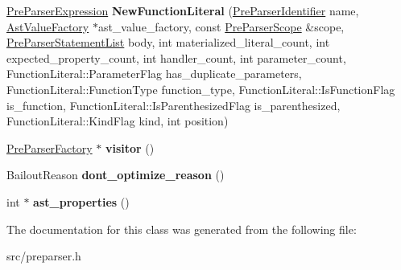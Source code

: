 \begin{DoxyCompactItemize}
\item 
\hypertarget{classv8_1_1internal_1_1_pre_parser_factory_a4cfe54e56810622bf6ef006b8387faaf}{}\hyperlink{classv8_1_1internal_1_1_pre_parser_expression}{Pre\+Parser\+Expression} {\bfseries New\+Function\+Literal} (\hyperlink{classv8_1_1internal_1_1_pre_parser_identifier}{Pre\+Parser\+Identifier} name, \hyperlink{classv8_1_1internal_1_1_ast_value_factory}{Ast\+Value\+Factory} $\ast$ast\+\_\+value\+\_\+factory, const \hyperlink{classv8_1_1internal_1_1_pre_parser_scope}{Pre\+Parser\+Scope} \&scope, \hyperlink{classv8_1_1internal_1_1_pre_parser_statement_list}{Pre\+Parser\+Statement\+List} body, int materialized\+\_\+literal\+\_\+count, int expected\+\_\+property\+\_\+count, int handler\+\_\+count, int parameter\+\_\+count, Function\+Literal\+::\+Parameter\+Flag has\+\_\+duplicate\+\_\+parameters, Function\+Literal\+::\+Function\+Type function\+\_\+type, Function\+Literal\+::\+Is\+Function\+Flag is\+\_\+function, Function\+Literal\+::\+Is\+Parenthesized\+Flag is\+\_\+parenthesized, Function\+Literal\+::\+Kind\+Flag kind, int position)\label{classv8_1_1internal_1_1_pre_parser_factory_a4cfe54e56810622bf6ef006b8387faaf}

\item 
\hypertarget{classv8_1_1internal_1_1_pre_parser_factory_abebaca1d94bf5b5d812b27df5826140d}{}\hyperlink{classv8_1_1internal_1_1_pre_parser_factory}{Pre\+Parser\+Factory} $\ast$ {\bfseries visitor} ()\label{classv8_1_1internal_1_1_pre_parser_factory_abebaca1d94bf5b5d812b27df5826140d}

\item 
\hypertarget{classv8_1_1internal_1_1_pre_parser_factory_a60db8f750245c428f3bf349623b2b62a}{}Bailout\+Reason {\bfseries dont\+\_\+optimize\+\_\+reason} ()\label{classv8_1_1internal_1_1_pre_parser_factory_a60db8f750245c428f3bf349623b2b62a}

\item 
\hypertarget{classv8_1_1internal_1_1_pre_parser_factory_acc5ec170f2fbb0def2a4cfec98a033e4}{}int $\ast$ {\bfseries ast\+\_\+properties} ()\label{classv8_1_1internal_1_1_pre_parser_factory_acc5ec170f2fbb0def2a4cfec98a033e4}

\end{DoxyCompactItemize}


The documentation for this class was generated from the following file\+:\begin{DoxyCompactItemize}
\item 
src/preparser.\+h\end{DoxyCompactItemize}
